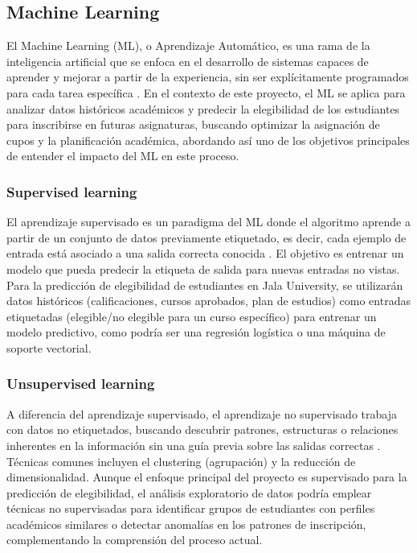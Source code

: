 \subsection{Machine Learning}
El Machine Learning (ML), o Aprendizaje Automático, es una rama de la inteligencia artificial que se enfoca en el desarrollo de sistemas capaces de aprender y mejorar a partir de la experiencia, sin ser explícitamente programados para cada tarea específica \parencite{Samuel1959}.
En el contexto de este proyecto, el ML se aplica para analizar datos históricos académicos y predecir la elegibilidad de los estudiantes para inscribirse en futuras asignaturas, buscando optimizar la asignación de cupos y la planificación académica, abordando así uno de los objetivos principales de entender el impacto del ML en este proceso.

\subsubsection{Supervised learning}
El aprendizaje supervisado es un paradigma del ML donde el algoritmo aprende a partir de un conjunto de datos previamente etiquetado, es decir, cada ejemplo de entrada está asociado a una salida correcta conocida \parencite{Bishop2006}.
El objetivo es entrenar un modelo que pueda predecir la etiqueta de salida para nuevas entradas no vistas.
Para la predicción de elegibilidad de estudiantes en Jala University, se utilizarán datos históricos (calificaciones, cursos aprobados, plan de estudios) como entradas etiquetadas (elegible/no elegible para un curso específico) para entrenar un modelo predictivo, como podría ser una regresión logística o una máquina de soporte vectorial.

\subsubsection{Unsupervised learning}
A diferencia del aprendizaje supervisado, el aprendizaje no supervisado trabaja con datos no etiquetados, buscando descubrir patrones, estructuras o relaciones inherentes en la información sin una guía previa sobre las salidas correctas \parencite{Hastie2009}.
Técnicas comunes incluyen el clustering (agrupación) y la reducción de dimensionalidad.
Aunque el enfoque principal del proyecto es supervisado para la predicción de elegibilidad, el análisis exploratorio de datos podría emplear técnicas no supervisadas para identificar grupos de estudiantes con perfiles académicos similares o detectar anomalías en los patrones de inscripción, complementando la comprensión del proceso actual.
